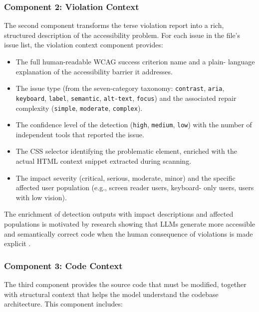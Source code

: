 \subsubsection{Component 2: Violation Context}

The second component transforms the terse violation report into a rich,
structured description of the accessibility problem.  For each issue in the
file's issue list, the violation context component provides:

\begin{itemize}
  \item The full human-readable WCAG success criterion name and a plain-
    language explanation of the accessibility barrier it addresses.
  \item The issue type (from the seven-category taxonomy: \texttt{contrast},
    \texttt{aria}, \texttt{keyboard}, \texttt{label}, \texttt{semantic},
    \texttt{alt-text}, \texttt{focus}) and the associated repair complexity
    (\texttt{simple}, \texttt{moderate}, \texttt{complex}).
  \item The confidence level of the detection (\texttt{high}, \texttt{medium},
    \texttt{low}) with the number of independent tools that reported the issue.
  \item The CSS selector identifying the problematic element, enriched with
    the actual HTML context snippet extracted during scanning.
  \item The impact severity (critical, serious, moderate, minor) and the
    specific affected user population (e.g., screen reader users, keyboard-
    only users, users with low vision).
\end{itemize}

\noindent
The enrichment of detection outputs with impact descriptions and affected
populations is motivated by research showing that LLMs generate more
accessible and semantically correct code when the human consequence of
violations is made explicit \cite{feathers2024}.

\subsubsection{Component 3: Code Context}

The third component provides the source code that must be modified, together
with structural context that helps the model understand the codebase
architecture.  This component includes:

